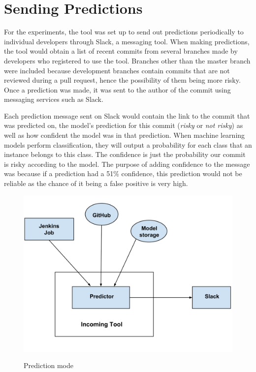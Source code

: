 \documentclass[../main.tex]{subfiles}
\begin{document}
\section{Sending Predictions}

For the experiments, the tool was set up to send out predictions periodically to individual developers through Slack, a messaging tool. When making predictions, the tool would obtain a list of recent commits from several branches made by developers who registered to use the tool. Branches other than the master branch were included because development branches contain commits that are not reviewed during a pull request, hence the possibility of them being more risky. Once a prediction was made, it was sent to the author of the commit using messaging services such as Slack. 

Each prediction message sent on Slack would contain the link to the commit that was predicted on, the model's prediction for this commit (\textit{risky} or \textit{not risky}) as well as how confident the model was in that prediction. When machine learning models perform classification, they will output a probability for each class that an instance belongs to this class. The confidence is just the probability our commit is risky according to the model. The purpose of adding confidence to the message was because if a prediction had a 51\% confidence, this prediction would not be reliable as the chance of it being a false positive is very high. 

\begin{figure}[H]
\centering
\includegraphics[scale=0.15]{images/Technical_Contribution/incoming_2.png}
\label{fig:incoming2}
\caption{Prediction mode}
\end{figure}
\end{document}
